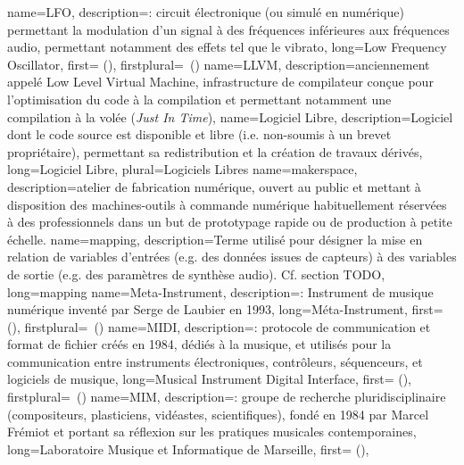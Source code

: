 {
    name={LFO},
    description={\textit{}: circuit électronique (ou simulé en numérique) permettant la modulation d'un signal à des fréquences inférieures aux fréquences audio, permettant notamment des effets tel que le vibrato},
    long={Low Frequency Oscillator},
    first={} (),
    firstplural={\glspluralsuffix\ (\glspluralsuffix)}
}
{
    name={LLVM},
    description={anciennement appelé Low Level Virtual Machine, infrastructure de compilateur conçue pour l'optimisation du code à la compilation et permettant notamment une compilation à la volée (\textit{Just In Time})},
}
{
    name={Logiciel Libre},
    description={Logiciel dont le code source est disponible et libre (i.e. non-soumis à un brevet propriétaire), permettant sa redistribution et la création de travaux dérivés},
    long={Logiciel Libre},
    plural={Logiciels Libres}
}
{
    name={makerspace},
    description={atelier de fabrication numérique, ouvert au public et mettant à disposition des machines-outils à commande numérique habituellement réservées à des professionnels dans un but de prototypage rapide ou de production à petite échelle.}
}
{
    name={mapping},
    description={Terme utilisé pour désigner la mise en relation de variables d'entrées (e.g. des données issues de capteurs) à des variables de sortie (e.g. des paramètres de synthèse audio). Cf. section TODO},
    long={mapping}
}
{
    name={Meta-Instrument},
    description={\textit{}: Instrument de musique numérique inventé par Serge de Laubier en 1993},
    long={Méta-Instrument},
    first={} (),
    firstplural={\glspluralsuffix\ (\glspluralsuffix)}
}
{
    name={MIDI},
    description={\textit{}: protocole de communication et format de fichier créés en 1984, dédiés à la musique, et utilisés pour la communication entre instruments électroniques, contrôleurs, séquenceurs, et logiciels de musique},
    long={Musical Instrument Digital Interface},
   	first={} (),
    firstplural={\glspluralsuffix\ (\glspluralsuffix)}
}
{
    name={MIM},
    description={\textit{}: groupe de recherche pluridisciplinaire (compositeurs, plasticiens, vidéastes, scientifiques), fondé en 1984 par Marcel Frémiot et portant sa réflexion sur les pratiques musicales contemporaines},
    long={Laboratoire Musique et Informatique de Marseille},
    first={} (),
}
